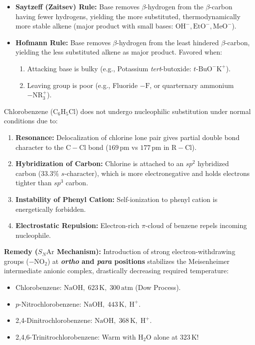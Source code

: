 \documentclass[10pt,a4paper]{article}
\begin{document}
\begin{usecasebox}
\begin{itemize}
  \item \textbf{Saytzeff (Zaitsev) Rule:} Base removes $\beta$-hydrogen from the $\beta$-carbon having fewer hydrogens, yielding the more substituted, thermodynamically more stable alkene (major product with small bases: $\mathrm{OH}^-, \mathrm{EtO}^-, \mathrm{MeO}^-$).
  \item \textbf{Hofmann Rule:} Base removes $\beta$-hydrogen from the least hindered $\beta$-carbon, yielding the less substituted alkene as major product. Favored when:
  \begin{enumerate}
    \item Attacking base is bulky (e.g., Potassium \textit{tert}-butoxide: $t\text{-BuO}^-\mathrm{K}^+$).
    \item Leaving group is poor (e.g., Fluoride $-\mathrm{F}$, or quarternary ammonium $-\mathrm{NR}_3^+$).
  \end{enumerate}
\end{itemize}
\end{usecasebox}

\begin{trapbox}
Chlorobenzene ($\mathrm{C_6H_5Cl}$) does not undergo nucleophilic substitution under normal conditions due to:
\begin{enumerate}
  \item \textbf{Resonance:} Delocalization of chlorine lone pair gives partial double bond character to the $\mathrm{C-Cl}$ bond ($169\,\mathrm{pm}$ vs $177\,\mathrm{pm}$ in $\mathrm{R-Cl}$).
  \item \textbf{Hybridization of Carbon:} Chlorine is attached to an $sp^2$ hybridized carbon ($33.3\%$ $s$-character), which is more electronegative and holds electrons tighter than $sp^3$ carbon.
  \item \textbf{Instability of Phenyl Cation:} Self-ionization to phenyl cation is energetically forbidden.
  \item \textbf{Electrostatic Repulsion:} Electron-rich $\pi$-cloud of benzene repels incoming nucleophile.
\end{enumerate}
\textbf{Remedy ($S_N\mathrm{Ar}$ Mechanism):} Introduction of strong electron-withdrawing groups ($-\mathrm{NO}_2$) at \textbf{\textit{ortho} and \textit{para} positions} stabilizes the Meisenheimer intermediate anionic complex, drastically decreasing required temperature:
\begin{itemize}
  \item Chlorobenzene: $\mathrm{NaOH},\; 623\,\mathrm{K},\; 300\,\mathrm{atm}$ (Dow Process).
  \item $p$-Nitrochlorobenzene: $\mathrm{NaOH},\; 443\,\mathrm{K},\; \mathrm{H}^+$.
  \item 2,4-Dinitrochlorobenzene: $\mathrm{NaOH},\; 368\,\mathrm{K},\; \mathrm{H}^+$.
  \item 2,4,6-Trinitrochlorobenzene: Warm with $\mathrm{H_2O}$ alone at $323\,\mathrm{K}$!
\end{itemize}
\end{trapbox}
\end{document}
